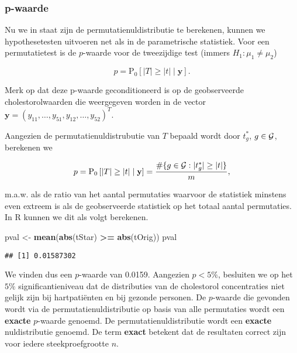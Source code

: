 \documentclass[
  12pt,dutch,coursenotes]{book}
\newenvironment{Shaded}{\begin{snugshade}}{\end{snugshade}}
\newcommand{\KeywordTok}[1]{\textcolor[rgb]{0.13,0.29,0.53}{\textbf{#1}}}
\newcommand{\NormalTok}[1]{#1}
\newcommand{\OperatorTok}[1]{\textcolor[rgb]{0.81,0.36,0.00}{\textbf{#1}}}
\newcommand{\StringTok}[1]{\textcolor[rgb]{0.31,0.60,0.02}{#1}}
\theoremstyle{definition}
\theoremstyle{definition}
\theoremstyle{definition}
\theoremstyle{remark}
\begin{document}
\hypertarget{p-waarde}{%
\subsubsection{p-waarde}\label{p-waarde}}

Nu we in staat zijn de permutatienuldistributie te berekenen, kunnen we hypothesetesten uitvoeren net als in de parametrische statistiek.
Voor een permutatietest is de \(p\)-waarde voor de tweezijdige test (immers \(H_1: \mu_1 \neq \mu_2\))

\[p=\text{P}_0\left[\vert T\vert \geq \vert t\vert \mid \mathbf{y}\right].\]

Merk op dat deze p-waarde geconditioneerd is op de geobserveerde cholestorolwaarden die weergegeven worden in de vector \(\mathbf{y}=(y_{11},\ldots,y_{51},y_{12},\ldots,y_{52})^T\).

Aangezien de permutatienuldistrubutie van \(T\) bepaald wordt door \(t^*_g\), \(g \in{\cal{G}}\), berekenen we

\[p  = \text{P}_0\left[\left\vert T\right\vert \geq \left\vert t\right\vert \mid \mathbf{y}\right] = \frac{\#\{g\in {\cal{G}}: \vert t^*_g\vert \geq \vert t \vert \}}{m},\]

m.a.w. als de ratio van het aantal permutaties waarvoor de statistiek minstens even extreem is als de geobserveerde statistiek op het totaal aantal permutaties. In R kunnen we dit als volgt berekenen.

\begin{Shaded}
\begin{Highlighting}[]
\NormalTok{pval \textless{}{-}}\StringTok{ }\KeywordTok{mean}\NormalTok{(}\KeywordTok{abs}\NormalTok{(tStar) }\OperatorTok{\textgreater{}=}\StringTok{ }\KeywordTok{abs}\NormalTok{(tOrig))}
\NormalTok{pval}
\end{Highlighting}
\end{Shaded}

\begin{verbatim}
## [1] 0.01587302
\end{verbatim}

We vinden dus een \(p\)-waarde van 0.0159. Aangezien \(p<5\%\), besluiten we op het \(5\%\) significantieniveau dat de distributies van de cholestorol concentraties niet gelijk zijn bij hartpatiënten en bij gezonde personen.
De \(p\)-waarde die gevonden wordt via de permutatienuldistributie op basis van alle permutaties wordt een \textbf{exacte} \(p\)-waarde genoemd. De permutatienuldistributie wordt een \textbf{exacte} nuldistributie genoemd. De term \textbf{exact} betekent dat de resultaten correct zijn voor iedere steekproefgrootte \(n\).
\end{document}
